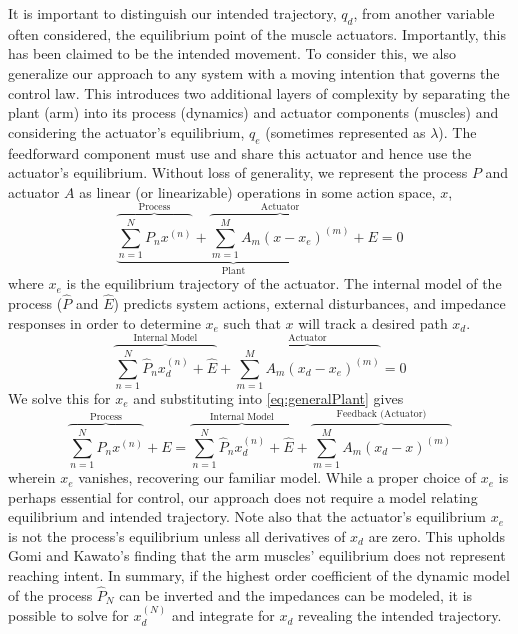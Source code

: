 It is important to distinguish our intended trajectory, $q_d$, from another variable often considered, the equilibrium point of the muscle actuators. Importantly, this has been claimed to be the intended movement\cite{feldman1995origin}. To consider this, we also generalize our approach to any system with a moving intention that governs the control law. This introduces two additional layers of complexity by separating the plant (arm) into its process (dynamics) and actuator components (muscles) and considering the actuator's equilibrium, $q_e$ (sometimes represented as $\lambda$). The feedforward component must use and share this actuator and hence use the actuator's equilibrium. Without loss of generality, we represent the process $P$ and actuator $A$ as linear (or linearizable) operations in some action space, $x$,
\begin{equation} \label{eq:generalPlant}
\underbrace{\overbrace{\sum_{n=1}^N P_nx^{(n)}}^\text{Process}+\overbrace{\sum_{m=1}^M A_m(x-x_e)^{(m)}}^\text{Actuator}}_\text{Plant}+E=0
\end{equation}
where $x_e$ is the equilibrium trajectory of the actuator. The internal model of the process ($\hat{P}$ and $\hat{E}$) predicts system actions, external disturbances, and impedance responses in order to determine $x_e$ such that $x$ will track a desired path $x_d$.    
\begin{equation}
\overbrace{\sum_{n=1}^N \hat{P}_n x^{(n)}_d+\hat{E}}^\text{Internal Model}+\overbrace{\sum_{m=1}^M A_m(x_d-x_e)^{(m)}}^\text{Actuator}=0
\end{equation}
We solve this for $x_e$ and substituting into \eqref{eq:generalPlant} gives
\begin{equation}
\overbrace{\sum_{n=1}^N P_nx^{(n)}}^\text{Process}+E=\overbrace{\sum_{n=1}^N \hat{P}_n x^{(n)}_d+\hat{E}}^\text{Internal Model}+\overbrace{\sum_{m=1}^M A_m (x_d-x)^{(m)}}^\text{Feedback (Actuator)}
\end{equation}
wherein $x_e$ vanishes, recovering our familiar model. While a proper choice of $x_e$ is perhaps essential for control, our approach does not require a model relating equilibrium and intended trajectory. Note also that the actuator's equilibrium $x_e$ is not the process's equilibrium unless all derivatives of $x_d$ are zero. This upholds Gomi and Kawato's finding that the arm muscles' equilibrium does not represent reaching intent\cite{gomi1997human}. In summary, if the highest order coefficient of the dynamic model of the process $\hat{P}_N$ can be inverted and the impedances can be modeled, it is possible to solve for $x_d^{(N)}$ and integrate for $x_d$ revealing the intended trajectory.

